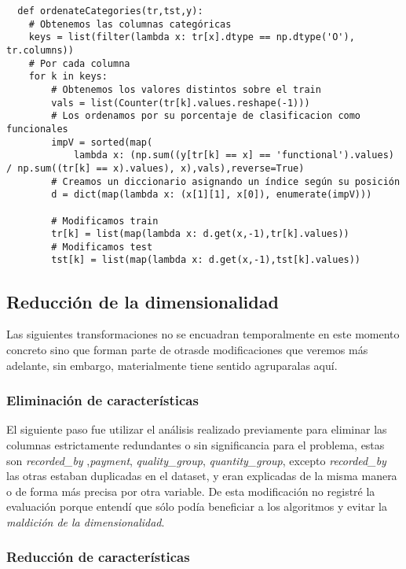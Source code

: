 \documentclass{article}
\begin{document}
\begin{verbatim}
  def ordenateCategories(tr,tst,y):
    # Obtenemos las columnas categóricas
    keys = list(filter(lambda x: tr[x].dtype == np.dtype('O'), tr.columns))
    # Por cada columna
    for k in keys:
        # Obtenemos los valores distintos sobre el train
        vals = list(Counter(tr[k].values.reshape(-1)))
        # Los ordenamos por su porcentaje de clasificacion como funcionales
        impV = sorted(map(
            lambda x: (np.sum((y[tr[k] == x] == 'functional').values) / np.sum((tr[k] == x).values), x),vals),reverse=True)
        # Creamos un diccionario asignando un índice según su posición
        d = dict(map(lambda x: (x[1][1], x[0]), enumerate(impV)))
		
        # Modificamos train
        tr[k] = list(map(lambda x: d.get(x,-1),tr[k].values))
        # Modificamos test
        tst[k] = list(map(lambda x: d.get(x,-1),tst[k].values))
\end{verbatim}

\subsection{Reducción de la dimensionalidad}

Las siguientes transformaciones no se encuadran temporalmente en este momento concreto sino que forman parte de otrasde modificaciones que veremos más adelante, sin embargo, materialmente tiene sentido agruparalas aquí.

\subsubsection{Eliminación de características}

El siguiente paso fue utilizar el análisis realizado previamente para eliminar las columnas estrictamente redundantes o sin significancia para el problema, estas son \textit{recorded\_by} ,\textit{payment}, \textit{quality\_group}, \textit{quantity\_group}, excepto \textit{recorded\_by} las otras estaban duplicadas en el dataset, y eran explicadas de la misma manera o de forma más precisa por otra variable. De esta modificación no registré la evaluación porque entendí que sólo podía beneficiar a los algoritmos y evitar la \textit{maldición de la dimensionalidad}.

\subsubsection{Reducción de características}
\end{document}
